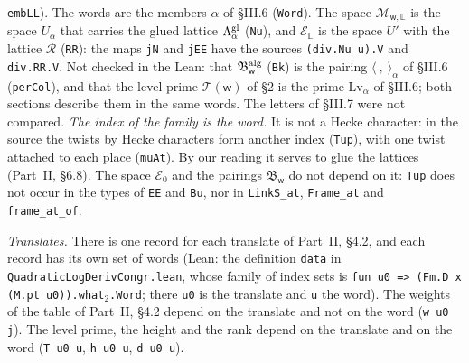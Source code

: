 \documentclass[11pt,letterpaper]{article}
\begin{document}
\texttt{embLL}). The words are the members $\alpha$ of \S III.6 (\texttt{Word}). The space
$\mathcal M_{\mathsf w,\mathbb L}$ is the space $U_\alpha$ that carries the glued lattice
$\Lambda^{\rm gl}_\alpha$ (\texttt{Nu}), and $\mathcal E_{\mathbb L}$ is the space $U'$ with the lattice
$\mathcal R$ (\texttt{RR}): the maps \texttt{jN} and \texttt{jEE} have the sources \texttt{(div.Nu u).V} and
\texttt{div.RR.V}. Not checked in the Lean: that $\mathfrak B^{\rm alg}_{\mathsf w}$ (\texttt{Bk}) is the
pairing $\langle\ ,\ \rangle_\alpha$ of \S III.6 (\texttt{perCol}), and that the level prime
$\mathcal T(\mathsf w)$ of \S2 is the prime $\mathrm{Lv}_\alpha$ of \S III.6; both sections describe them
in the same words. The letters of \S III.7 were not compared.
\emph{The index of the family is the word.} It is not a Hecke character: in the source the twists by Hecke
characters form another index (\texttt{Tup}), with one twist attached to each place (\texttt{muAt}). By our
reading it serves to glue the lattices (Part~II, \S6.8). The space $\mathcal E_0$ and the pairings
$\mathfrak B_{\mathsf w}$ do not depend on it: \texttt{Tup} does not occur in the types of \texttt{EE} and
\texttt{Bu}, nor in \texttt{LinkS\_at}, \texttt{Frame\_at} and \texttt{frame\_at\_of}.

\emph{Translates.} There is one record for each translate of Part~II, \S4.2, and each record has its own set
of words (Lean: the definition \texttt{data} in \texttt{QuadraticLogDerivCongr.lean}, whose family of index
sets is \texttt{fun u0 => (Fm.D x (M.pt u0)).what}$_2$\texttt{.Word}; there \texttt{u0} is the translate and \texttt{u}
the word). The weights of the table of Part~II, \S4.2 depend on the translate and not on the word
(\texttt{w u0 j}). The level prime, the height and the rank depend on the translate and on the word
(\texttt{T u0 u}, \texttt{h u0 u}, \texttt{d u0 u}).
\end{document}
